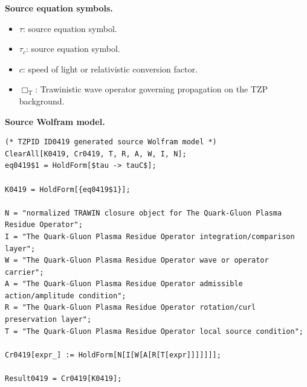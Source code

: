 \begin{minipage}[t]{0.49\linewidth}
\begingroup
\small
\raggedright
\textbf{Source equation symbols.}\par
\begin{itemize}[leftmargin=1.35em,itemsep=1pt,topsep=1pt,parsep=0pt]
    \item $\tau$: source equation symbol.
    \item $\tau_{c}$: source equation symbol.
    \item $c$: speed of light or relativistic conversion factor.
    \item $\Box_{\mathrm{T}}$: Trawinistic wave operator governing propagation on the TZP background.
\end{itemize}
\endgroup
\end{minipage}\hfill
\begin{minipage}[t]{0.47\linewidth}
\begingroup
\scriptsize
\raggedright
\textbf{Source Wolfram model.}\par
\begin{Verbatim}[fontsize=\tiny,breaklines=true,breakanywhere=true]
(* TZPID ID0419 generated source Wolfram model *)
ClearAll[K0419, Cr0419, T, R, A, W, I, N];
eq0419$1 = HoldForm[$tau -> tauC$];

K0419 = HoldForm[{eq0419$1}];

N = "normalized TRAWIN closure object for The Quark-Gluon Plasma Residue Operator";
I = "The Quark-Gluon Plasma Residue Operator integration/comparison layer";
W = "The Quark-Gluon Plasma Residue Operator wave or operator carrier";
A = "The Quark-Gluon Plasma Residue Operator admissible action/amplitude condition";
R = "The Quark-Gluon Plasma Residue Operator rotation/curl preservation layer";
T = "The Quark-Gluon Plasma Residue Operator local source condition";

Cr0419[expr_] := HoldForm[N[I[W[A[R[T[expr]]]]]]];

Result0419 = Cr0419[K0419];
\end{Verbatim}
\endgroup
\end{minipage}

